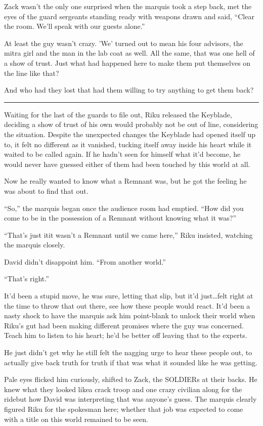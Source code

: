 Zack wasn't the only one surprised when the marquis took a step back, met the eyes of the guard sergeants standing ready with weapons drawn and said, ``Clear the room. We'll speak with our guests alone.''

At least the guy wasn't crazy. 'We' turned out to mean his four advisors, the mitra girl and the man in the lab coat as well. All the same, that was one hell of a show of trust. Just what had happened here to make them put themselves on the line like that?

And who had they lost that had them willing to try anything to get them back?

\fancybreak{\pfbreakdisplay}


Waiting for the last of the guards to file out, Riku released the Keyblade, deciding a show of trust of his own would probably not be out of line, considering the situation. Despite the unexpected changes the Keyblade had opened itself up to, it felt no different as it vanished, tucking itself away inside his heart while it waited to be called again. If he hadn't seen for himself what it'd become, he would never have guessed either of them had been touched by this world at all.

Now he really wanted to know what a Remnant was, but he got the feeling he was about to find that out.

``So,'' the marquis began once the audience room had emptied. ``How did you come to be in the possession of a Remnant without knowing what it was?''

``That's just it\textemdash it wasn't a Remnant until we came here,'' Riku insisted, watching the marquis closely.

David didn't disappoint him. ``From another world.''

``That's right.''

It'd been a stupid move, he was sure, letting that slip, but it'd just\ldots felt right at the time to throw that out there, see how these people would react. It'd been a nasty shock to have the marquis ask him point-blank to unlock their world when Riku's gut had been making different promises where the guy was concerned. Teach him to listen to his heart; he'd be better off leaving that to the experts.

He just didn't get why he still felt the nagging urge to hear these people out, to actually give back truth for truth if that was what it sounded like he was getting.

Pale eyes flicked him curiously, shifted to Zack, the SOLDIERs at their backs. He knew what they looked like\textemdash a crack troop and one crazy civilian along for the ride\textemdash but how David was interpreting that was anyone's guess. The marquis clearly figured Riku for the spokesman here; whether that job was expected to come with a title on this world remained to be seen.

